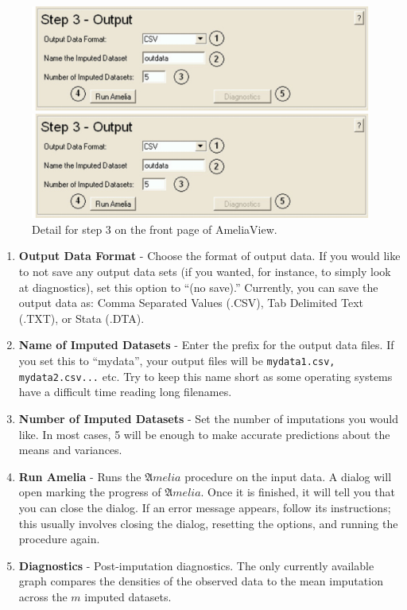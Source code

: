 \documentclass[12pt,titlepage]{article}
\begin{document}
\begin{figure}[ht]
 \begin{htmlonly} 
  \centering \includegraphics[scale=1]{step3} 
 \end{htmlonly}
 \begin{latexonly}
  \centering \includegraphics[scale=.75]{step3}
 \end{latexonly}
  \caption{Detail for step 3 on the front page of AmeliaView.}
\end{figure}
\begin{enumerate}
\item \textbf{Output Data Format} - Choose the format of output data.
  If you would like to not save any output data sets (if you wanted,
  for instance, to simply look at diagnostics), set this option to
  ``(no save).''  Currently, you can save the output data as: Comma
  Separated Values (.CSV), Tab Delimited Text (.TXT), or Stata (.DTA).
\item \textbf{Name of Imputed Datasets} - Enter the prefix for the
  output data files.  If you set this to ``mydata'', your output files
  will be \texttt{mydata1.csv, mydata2.csv...} etc.  Try to keep this
  name short as some operating systems have a difficult time reading
  long filenames.
\item \textbf{Number of Imputed Datasets} - Set the number of
  imputations you would like.  In most cases, 5 will be enough to make
  accurate predictions about the means and variances.
\item \textbf{Run Amelia} - Runs the ${\mathfrak Amelia}$ procedure on
  the input data.  A dialog will open marking the progress of
  ${\mathfrak Amelia}$.  Once it is finished, it will tell you that
  you can close the dialog.  If an error message appears, follow its
  instructions; this usually involves closing the dialog, resetting
  the options, and running the procedure again.
\item \textbf{Diagnostics} - Post-imputation diagnostics.  The only
  currently available graph compares the densities of the observed
  data to the mean imputation across the $m$ imputed datasets.
\end{enumerate}
\end{document}
